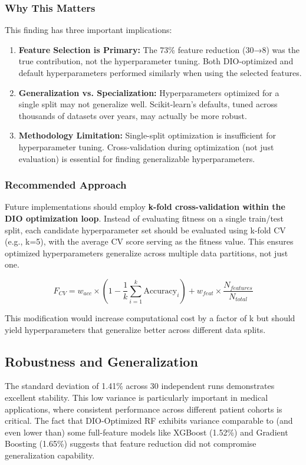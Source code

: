 \documentclass[12pt, a4paper]{article}
\begin{document}
\subsubsection{Why This Matters}
This finding has three important implications:

\begin{enumerate}
    \item \textbf{Feature Selection is Primary:} The 73\% feature reduction (30→8) was the true contribution, not the hyperparameter tuning. Both DIO-optimized and default hyperparameters performed similarly when using the selected features.
    
    \item \textbf{Generalization vs. Specialization:} Hyperparameters optimized for a single split may not generalize well. Scikit-learn's defaults, tuned across thousands of datasets over years, may actually be more robust.
    
    \item \textbf{Methodology Limitation:} Single-split optimization is insufficient for hyperparameter tuning. Cross-validation during optimization (not just evaluation) is essential for finding generalizable hyperparameters.
\end{enumerate}

\subsubsection{Recommended Approach}
Future implementations should employ \textbf{k-fold cross-validation within the DIO optimization loop}. Instead of evaluating fitness on a single train/test split, each candidate hyperparameter set should be evaluated using k-fold CV (e.g., k=5), with the average CV score serving as the fitness value. This ensures optimized hyperparameters generalize across multiple data partitions, not just one.

\begin{equation}
    F_{CV} = w_{acc} \times \left(1 - \frac{1}{k}\sum_{i=1}^{k} \text{Accuracy}_i\right) + w_{feat} \times \frac{N_{features}}{N_{total}}
\end{equation}

This modification would increase computational cost by a factor of k but should yield hyperparameters that generalize better across different data splits.

\subsection{Robustness and Generalization}
The standard deviation of 1.41\% across 30 independent runs demonstrates excellent stability. This low variance is particularly important in medical applications, where consistent performance across different patient cohorts is critical. The fact that DIO-Optimized RF exhibits variance comparable to (and even lower than) some full-feature models like XGBoost (1.52\%) and Gradient Boosting (1.65\%) suggests that feature reduction did not compromise generalization capability.
\end{document}
